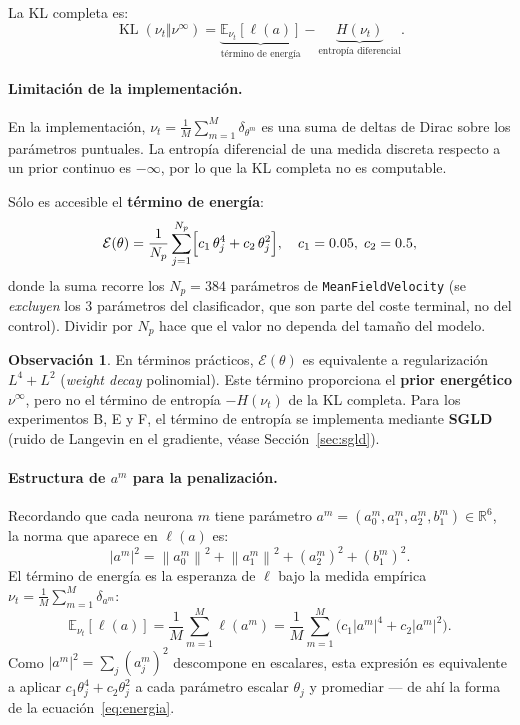 \documentclass[11pt, a4paper]{article}
\theoremstyle{definition}
\newtheorem{remark}{Observación}[section]
\newcommand{\R}{\mathbb{R}}
\newcommand{\E}{\mathbb{E}}
\newcommand{\norm}[1]{\left\|#1\right\|}
\newcommand{\abs}[1]{\left|#1\right|}
\begin{document}
La KL completa es:
\begin{equation}
  \operatorname{KL}(\nu_t \Vert \nu^\infty)
  = \underbrace{\E_{\nu_t}[\ell(a)]}_{\text{término de energía}}
  - \underbrace{H(\nu_t)}_{\text{entropía diferencial}}.
\end{equation}

\paragraph{Limitación de la implementación.}
En la implementación, $\nu_t = \frac{1}{M}\sum_{m=1}^M \delta_{\theta^m}$
es una suma de deltas de Dirac sobre los parámetros puntuales. La entropía
diferencial de una medida discreta respecto a un prior continuo es
$-\infty$, por lo que la KL completa no es computable.

Sólo es accesible el \textbf{término de energía}:
\begin{equation}
  \label{eq:energia}
  \mathcal{E}(\theta)
  = \frac{1}{N_p}\sum_{j=1}^{N_p}
    \Bigl[c_1\, \theta_j^4 + c_2\, \theta_j^2\Bigr],
  \quad c_1 = 0.05,\; c_2 = 0.5,
\end{equation}
donde la suma recorre los $N_p = 384$ parámetros de \texttt{MeanFieldVelocity}
(se \emph{excluyen} los 3 parámetros del clasificador, que son parte del
coste terminal, no del control). Dividir por $N_p$ hace que el valor no
dependa del tamaño del modelo.

\begin{remark}
  En términos prácticos, $\mathcal{E}(\theta)$ es equivalente a regularización
  $L^4 + L^2$ (\emph{weight decay} polinomial). Este término proporciona el
  \textbf{prior energético} $\nu^\infty$, pero no el término de entropía
  $-H(\nu_t)$ de la KL completa. Para los experimentos B, E y F, el término
  de entropía se implementa mediante \textbf{SGLD} (ruido de Langevin en el
  gradiente, véase Sección~\ref{sec:sgld}).
\end{remark}

\paragraph{Estructura de $a^m$ para la penalización.}
Recordando que cada neurona $m$ tiene parámetro
$a^m = (a_0^m, a_1^m, a_2^m, b_1^m) \in \R^6$, la norma que aparece en
$\ell(a)$ es:
\begin{equation}
  \abs{a^m}^2 = \norm{a_0^m}^2 + \norm{a_1^m}^2 + (a_2^m)^2 + (b_1^m)^2.
\end{equation}
El término de energía es la esperanza de $\ell$ bajo la medida empírica
$\nu_t = \frac{1}{M}\sum_{m=1}^M \delta_{a^m}$:
\begin{equation*}
  \mathbb{E}_{\nu_t}[\ell(a)]
  = \frac{1}{M}\sum_{m=1}^M \ell(a^m)
  = \frac{1}{M}\sum_{m=1}^M \bigl(c_1|a^m|^4 + c_2|a^m|^2\bigr).
\end{equation*}
Como $|a^m|^2 = \sum_j (a^m_j)^2$ descompone en escalares, esta expresión
es equivalente a aplicar $c_1\theta_j^4 + c_2\theta_j^2$ a cada parámetro
escalar $\theta_j$ y promediar — de ahí la forma de la ecuación~\eqref{eq:energia}.
\end{document}
